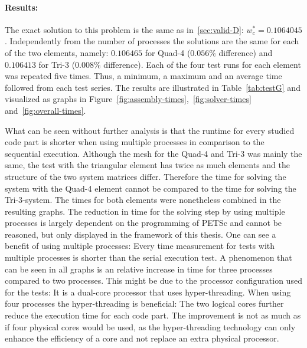   \paragraph{Results:} The exact solution to this problem is the same as in~\ref{sec:valid-D}: $w_c^* = 0.1064045$. Independently from the number of processes the solutions are the same for each of the two elements, namely: $0.106465$ for Quad-4 ($0.056\%$ difference) and $0.106413$ for Tri-3 ($0.008\%$ difference). Each of the four test runs for each element was repeated five times. Thus, a minimum, a maximum and an average time followed from each test series. The results are illustrated in Table~\ref{tab:testG} and visualized as graphs in Figure~\ref{fig:assembly-times},~\ref{fig:solver-times} and~\ref{fig:overall-times}.
  
  What can be seen without further analysis is that the runtime for every studied code part is shorter when using multiple processes in comparison to the sequential execution. Although the mesh for the Quad-4 and Tri-3 was mainly the same, the test with the triangular element has twice as much elements and the structure of the two system matrices differ. Therefore the time for solving the system with the Quad-4 element cannot be compared to the time for solving the Tri-3-system. The times for both elements were nonetheless combined in the resulting graphs. The reduction in time for the solving step by using multiple processes is largely dependent on the programming of PETSc and cannot be reasoned, but only displayed in the framework of this thesis. One can see a benefit of using multiple processes: Every time measurement for tests with multiple processes is shorter than the serial execution test. A phenomenon that can be seen in all graphs is an relative increase in time for three processes compared to two processes. This might be due to the processor configuration used for the tests: It is a dual-core processor that uses hyper-threading. When using four processes the hyper-threading is beneficial: The two logical cores further reduce the execution time for each code part. The improvement is not as much as if four physical cores would be used, as the hyper-threading technology can only enhance the efficiency of a core and not replace an extra physical processor.
  
